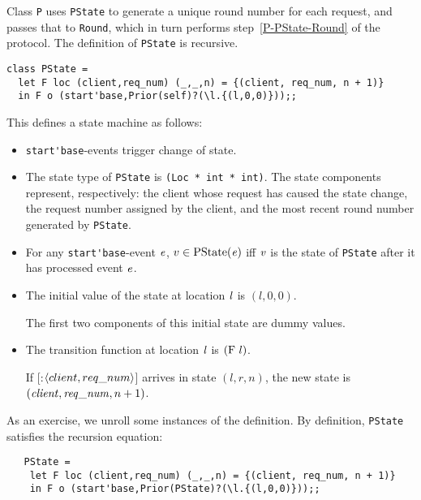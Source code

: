 \documentclass[final]{article}
\newcommand{\dgclassrel}[3]{\NUPRLclassrel{}{#1}{}{#2}{#3}}
\newcommand{\listinline}[1]{\text{\lstinline{#1}}}
\newcommand{\MSG}[2]{[\listinline{#1}:#2]}
\begin{document}

Class \lstinline{P} uses \lstinline{PState} to generate a unique round
number for each request, and passes that to \lstinline{Round}, which
in turn performs step~\ref{P-PState-Round} of the protocol.  The
definition of \lstinline{PState} is recursive.
\begin{emlcode}
\begin{lstlisting}
class PState =
  let F loc (client,req_num) (_,_,n) = {(client, req_num, n + 1)}
  in F o (start'base,Prior(self)?(\l.{(l,0,0)}));;
\end{lstlisting}
\end{emlcode}

This defines a state machine as follows:
\begin{itemize}
\item
\lstinline{start'base}-events trigger change of state.

\item
The state type of \lstinline{PState} is
%
\lstinline{(Loc * int * int)}.  The state components represent,
respectively: the client whose request has caused the state change,
the request number assigned by the client, and the most recent round
number generated by \lstinline{PState}.

\item
For any \lstinline{start'base}-event $\mathit{e}$,
$\dgclassrel{\NUPRLevent}{\listinline{PState}}{v}$ iff $\mathit{v}$ is
the state of \lstinline{PState} after it has processed  event
$\mathit{e}$.

\item
The initial value of the state at location $\mathit{l}$ is $(l,0,0)$.

The first two components of this initial state are dummy values.

\item
The transition function at location $\mathit{l}$ is $(\listinline{F}~l)$.

If \MSG{start}{$\langle client,req\_num\rangle$} arrives in
state $(l,r,n)$, the new state is
$(\mathit{client},\mathit{req\_num},n+1)$.
\end{itemize}
As an exercise, we unroll some instances of the definition.
By definition, \lstinline{PState} satisfies the recursion equation:
\begin{lstlisting}
   PState =
    let F loc (client,req_num) (_,_,n) = {(client, req_num, n + 1)}
    in F o (start'base,Prior(PState)?(\l.{(l,0,0)}));;
\end{lstlisting}
\end{document}
